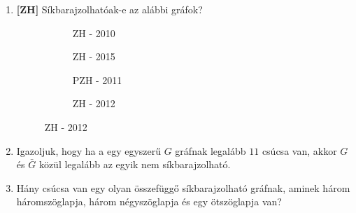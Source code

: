 \documentclass[a4paper,12pt]{article}
\begin{document}
\begin{enumerate}
            \hrule
            \item \textbf{[ZH]} Síkbarajzolhatóak-e az alábbi gráfok?
            \begin{figure}[!ht]
                \centering
                \begin{subfigure}{0.2\textwidth}
                    \centering				
                    
                    \caption{ZH - 2010}
                \end{subfigure}
                \begin{subfigure}{0.2\textwidth}
                    \centering					
                    
                    \caption{ZH - 2015}
                \end{subfigure}
                \begin{subfigure}{0.25\textwidth}
                    \centering					
                    
                    \caption{PZH - 2011}
                \end{subfigure}
                \begin{subfigure}{0.2\textwidth}
                    \centering					
                    
                    \caption{ZH - 2012}
                \end{subfigure}
            \end{figure}
            \item Igazoljuk, hogy ha a egy egyszerű $G$ gráfnak legalább $11$ csúcsa van, akkor $G$ és $\bar{G}$ közül legalább az egyik nem síkbarajzolható.
            \item Hány csúcsa van egy olyan összefüggő síkbarajzolható gráfnak, aminek három háromszöglapja, három négyszöglapja és egy ötszöglapja van?
    \end{enumerate}
\end{document}
